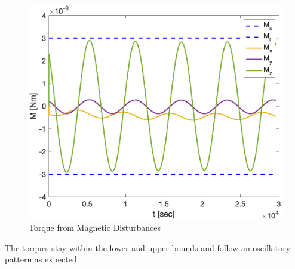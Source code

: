 \begin{figure}[H]
    \centering
    \captionsetup{justification = centering}
    \includegraphics[width = 15cm]{Images/PS5/magnetic_torque.png}
    \caption{Torque from Magnetic Disturbances}
    \label{fig:simulink_sol}
\end{figure}

The torques stay within the lower and upper bounds and follow an oscillatory pattern as expected.